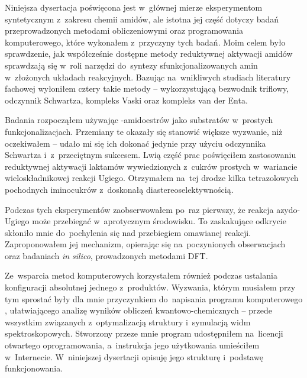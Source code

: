 Niniejsza dysertacja poświęcona jest w~głównej mierze eksperymentom syntetycznym z~zakresu
  chemii amidów, ale istotna jej część dotyczy badań przeprowadzonych metodami obliczeniowymi
  oraz programowania komputerowego, które wykonałem z~przyczyny tych badań.
Moim celem było sprawdzenie, jak współcześnie dostępne metody reduktywnej aktywacji
  amidów sprawdzają się w~roli narzędzi do~syntezy sfunkcjonalizowanych amin w~złożonych
  układach reakcyjnych.
Bazując na~wnikliwych studiach literatury fachowej wyłoniłem cztery takie metody \---
  wykorzystującą bezwodnik triflowy, odczynnik Schwartza, kompleks Vaski oraz kompleks van der Enta.

Badania rozpocząłem używając \textbeta{}-amidoestrów jako substratów w~prostych funkcjonalizacjach.
Przemiany te okazały się stanowić większe wyzwanie, niż oczekiwałem \--- udało mi się ich dokonać
  jedynie przy użyciu odczynnika Schwartza i~z~przeciętnym sukcesem.
Lwią część prac poświęciłem zastosowaniu reduktywnej aktywacji laktamów wywiedzionych z~cukrów
  prostych w~wariancie wieloskładnikowej reakcji Ugiego.
Otrzymałem na~tej drodze kilka tetrazolowych pochodnych iminocukrów z~doskonałą
  diastereoselektywnością.

Podczas tych eksperymentów zaobserwowałem po~raz pierwszy, że reakcja azydo-Ugiego może
  przebiegać w~aprotycznym środowisku.
To zaskakujące odkrycie skłoniło mnie do~pochylenia się nad przebiegiem omawianej reakcji.
Zaproponowałem jej mechanizm, opierając się na~poczynionych obserwacjach oraz badaniach
  \textit{in silico}, prowadzonych metodami DFT.

Ze~wsparcia metod komputerowych korzystałem również podczas ustalania konfiguracji absolutnej
  jednego z~produktów.
Wyzwania, którym musiałem przy tym sprostać były dla mnie przyczynkiem do~napisania programu
  komputerowego \tesliper{}, ułatwiającego analizę wyników obliczeń kwantowo-chemicznych \---
  przede wszystkim związanych z~optymalizacją struktury i~symulacją widm spektroskopowych.
Stworzony przeze mnie program udostępniłem na~licencji otwartego
  oprogramowania, a~instrukcja jego użytkowania umieściłem w~Internecie.
W~niniejszej dysertacji opisuję jego strukturę i~podstawę funkcjonowania.



